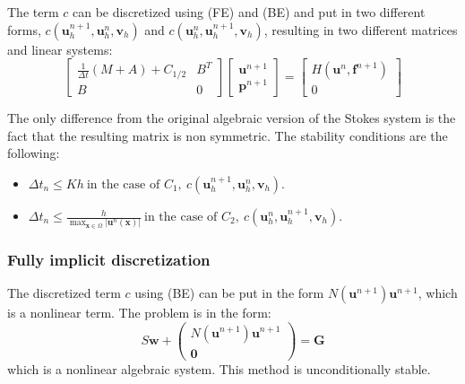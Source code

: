\documentclass[11pt]{book}
\begin{document}
The term $c$ can be discretized using (FE) and (BE) and put in two different forms, $c\left(\mathbf{u}_{h}^{n+1}, \mathbf{u}_{h}^{n}, \mathbf{v}_{h}\right)$ and $c\left(\mathbf{u}_{h}^{n}, \mathbf{u}_{h}^{n+1}, \mathbf{v}_{h}\right)$, resulting in two different matrices and linear systems:
\begin{equation*}
\begin{bmatrix}
    \frac{1}{\Delta t} (M+A) + C_{1/2}   & B^{T} \\
    B & 0 \end{bmatrix} \begin{bmatrix}
\mathbf{u}^{n+1} \\
\mathbf{p}^{n+1}
\end{bmatrix}
=
\begin{bmatrix} H (\mathbf{u}^{n},\mathbf{f}^{n+1}) \\ 0 \end{bmatrix}
\end{equation*}

The only difference from the original algebraic version of the Stokes system is the fact that the resulting matrix is non symmetric.
The stability conditions are the following:
\begin{itemize}
\item $\Delta t_n \leq  Kh \   \text{in the case of }C_1, \ c\left(\mathbf{u}_{h}^{n+1}, \mathbf{u}_{h}^{n}, \mathbf{v}_{h}\right).$
\item$\Delta t_n \leq  \frac{h}{\max _{\mathbf{x} \in \Omega}\left|\mathbf{u}^{n}(\mathbf{x})\right|}  \  \text{in the case of }C_2, \ c\left(\mathbf{u}_{h}^{n}, \mathbf{u}_{h}^{n+1}, \mathbf{v}_{h}\right)$.
\end{itemize}



\subsubsection*{Fully implicit discretization}

The discretized term $c$ using (BE) can be put in the form $N\left(\mathbf{u}^{n+1}\right) \mathbf{u}^{n+1}$, which is a nonlinear term. The problem is in the form: 
$$
S \mathbf{w}+\left(\begin{array}{c}N\left(\mathbf{u}^{n+1}\right) \mathbf{u}^{n+1} \\ \mathbf{0}\end{array}\right)=\mathbf{G}$$
which is a nonlinear algebraic system.
This method is unconditionally stable.
\end{document}
